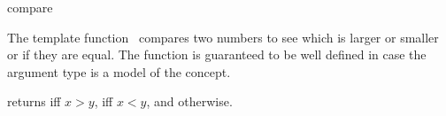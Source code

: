 \begin{ccRefFunction}{compare}

\ccDefinition

The template function \ccRefName\ compares two numbers to see which is larger or
smaller or if they are equal. The function is guaranteed to be well defined in case the argument type 
is a model of the  concept. 


{returns  iff $x>y$,  iff $x<y$, and 
otherwise.}

\\
\\

\end{ccRefFunction}
